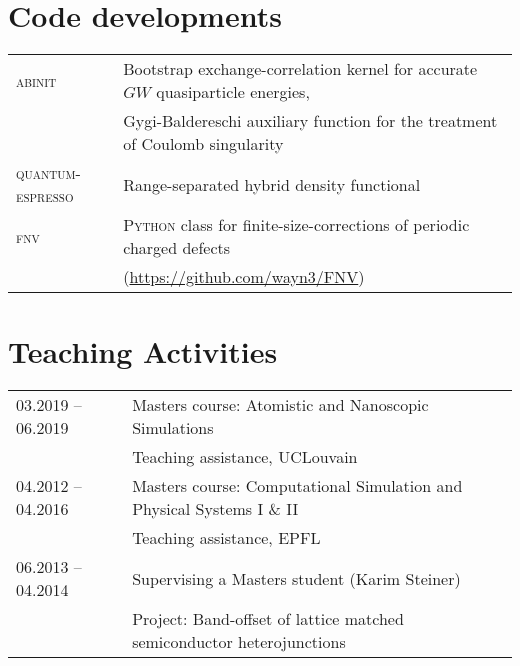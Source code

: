 \documentclass[a4paper, 11pt, DIV=15,headings=normal]{scrartcl}
\begin{document}
\section*{Code developments}
\begin{tabular}{ll}
\textsc{abinit}  & Bootstrap exchange-correlation kernel for accurate $GW$ quasiparticle energies, \\
                 & Gygi-Baldereschi auxiliary function for the treatment of
Coulomb singularity \\
\textsc{quantum-espresso} & Range-separated hybrid density functional \\
\textsc{fnv}     & \textsc{Python} class for finite-size-corrections of
periodic charged defects \\
                 & (\url{https://github.com/wayn3/FNV})
\\
\end{tabular} 

\section*{Teaching Activities}
\begin{tabular}{ll}
03.2019 -- 06.2019 & Masters course: Atomistic and Nanoscopic Simulations \\
                   & Teaching assistance, UCLouvain\\
04.2012 -- 04.2016 & Masters course: Computational Simulation and Physical Systems I \& II \\
                   & Teaching assistance, EPFL\\
06.2013 -- 04.2014 & Supervising a Masters student (Karim Steiner) \\
                   & Project: Band-offset of lattice matched semiconductor heterojunctions 
\end{tabular}
\end{document}
